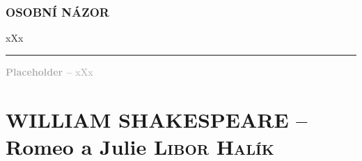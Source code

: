 \documentclass[A4paper]{extarticle} %
\begin{document}


\section*{OSOBNÍ NÁZOR}
\noindent 
xXx

\vfill

\noindent\begin{minipage}{\textwidth}
    \textcolor{darkgray}{\rule{\linewidth}{0.4pt}
    \footnotesize
    \textbf{Placeholder --} xXx
    }
\end{minipage}

\newpage


\changefontsize{8pt}

\part*{WILLIAM SHAKESPEARE -- Romeo a Julie {\hfill \normalfont\tiny\textsc{Libor Halík}}}
\end{document}
